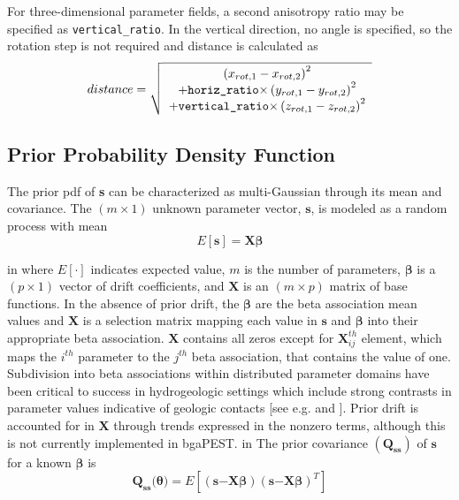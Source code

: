\documentclass[11pt,oneside,onecolumn]{usgsreport}
\begin{document}
\begin{appendix}
For three-dimensional parameter fields, a second anisotropy ratio
may be specified as \texttt{vertical\_ratio}. In the vertical direction,
no angle is specified, so the rotation step is not required and distance
is calculated as
\[
distance=\sqrt{\begin{array}{c}
\left(x_{rot,1}-x_{rot,2}\right)^{2}\\
+\texttt{{horiz\_ratio}\ensuremath{\times}}\left(y_{rot,1}-y_{rot,2}\right)^{2}\\
+\texttt{{vertical\_ratio}\ensuremath{\times}}\left(z_{rot,1}-z_{rot,2}\right)^{2}
\end{array}}
\]



\subsection{\label{sub:Prior-Probability-Density}Prior Probability Density Function}

The prior pdf of \textbf{s} can be characterized as multi-Gaussian
through its mean and covariance. The $(m\times1)$ unknown parameter
vector, $\mathbf{s}$, is modeled as a random process with mean
\begin{equation}
E[\mathbf{s}]=\mathbf{X}\mathbf{\beta}\label{eq:Es}
\end{equation}

 in
where $E[\cdot]$ indicates expected value, $m$ is the number of
parameters, $\mathbf{\beta}$ is a $(p\times1)$ vector of drift coefficients,
and $\mathbf{X}$ is an $(m\times p)$ matrix of base functions. In
the absence of prior drift, the $\mathbf{\beta}$ are the beta association
mean values and $\mathbf{X}$ is a selection matrix mapping each value
in $\mathbf{s}$ and $\mathbf{\beta}$ into their appropriate beta
association. $\mathbf{X}$ contains all zeros except for \textbf{$\mathbf{X}_{ij}^{th}$}
element, which maps the $i^{th}$ parameter to the $j^{th}$ beta
association, that contains the value of one. Subdivision into beta
associations within distributed parameter domains have been critical
to success in hydrogeologic settings which include strong contrasts
in parameter values indicative of geologic contacts {[}see e.g. \citealp{fienenEtal2004}
and \citealp{FienenWRR2008}{]}. Prior drift is accounted for in $\mathbf{X}$
through trends expressed in the nonzero terms, although this is not
currently implemented in bgaPEST.
 in
The prior covariance $(\mathbf{Q_{ss}})$ of $\mathbf{s}$ for a known
$\mathbf{\beta}$ is
\[
\mathbf{Q_{ss}(}\mathbf{\theta})=E[(\mathbf{s}\mathbf{-}\mathbf{X\beta})(\mathbf{s}\mathbf{-}\mathbf{X\beta})^{T}]
\]


\end{appendix}
\end{document}
